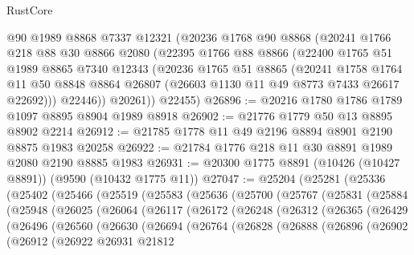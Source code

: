 \begin{lexlean}{RustCore}
\begin{coremodule}
      @90
      @1989
      @8868
      @7337
      @12321
      (@20236
        @1768
        @90
        @8868
        (@20241
          @1766
          @218
          @88
          @30
          @8866
          @2080
          (@22395
            @1766
            @88
            @8866
            (@22400
              @1765
              @51
              @1989
              @8865
              @7340
              @12343
              (@20236
                @1765
                @51
                @8865
                (@20241
                  @1758
                  @1764
                  @11
                  @50
                  @8848
                  @8864
                  @26807
                  (@26603 @1130 @11 @49 @8773 @7433 @26617 @22692)))
              @22446))
          @20261))
      @22455)
@26896 := @20216 @1780 @1786 @1789 @1097 @8895 @8904 @1989 @8918
@26902 := @21776 @1779 @50 @13 @8895 @8902 @2214
@26912 := @21785 @1778 @11 @49 @2196 @8894 @8901 @2190 @8875 @1983 @20258
@26922 := @21784 @1776 @218 @11 @30 @8891 @1989 @2080 @2190 @8885 @1983
@26931 := @20300 @1775 @8891 (@10426 (@10427 @8891)) (@9590 (@10432 @1775 @11))
@27047 := @25204
    (@25281
      (@25336
        (@25402
          (@25466
            (@25519
              (@25583
                (@25636
                  (@25700
                    (@25767
                      (@25831
                        (@25884
                          (@25948
                            (@26025
                              (@26064
                                (@26117
                                  (@26172
                                    (@26248
                                      (@26312
                                        (@26365
                                          (@26429
                                            (@26496
                                              (@26560
                                                (@26630
                                                  (@26694
                                                    (@26764
                                                      (@26828
                                                        (@26888
                                                          (@26896
                                                            (@26902
                                                              (@26912
                                                                (@26922
                                                                  @26931
                                                                  @21812

\end{coremodule}
\end{lexlean}
